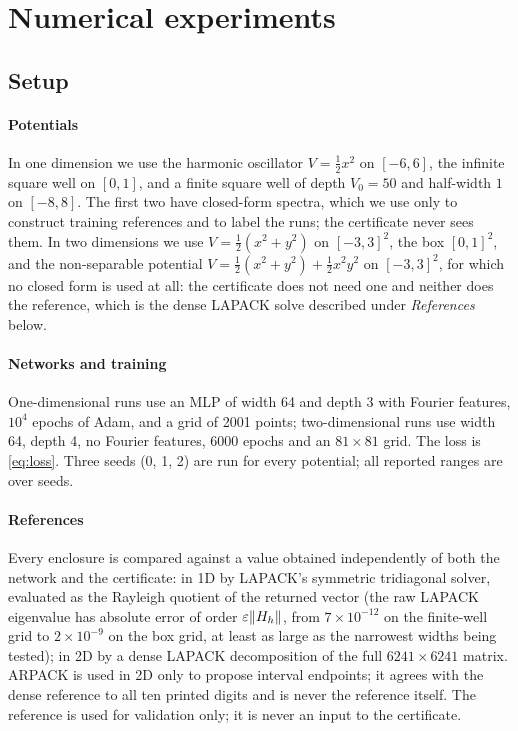 \section{Numerical experiments}
\label{sec:results}

\subsection{Setup}
\label{sec:setup}

\paragraph{Potentials} In one dimension we use the harmonic oscillator
$V=\tfrac12x^2$ on $[-6,6]$, the infinite square well on $[0,1]$, and a finite
square well of depth $V_0=50$ and half-width $1$ on $[-8,8]$. The first two
have closed-form spectra, which we use only to construct training references
and to label the runs; the certificate never sees them. In two dimensions we
use $V=\tfrac12(x^2+y^2)$ on $[-3,3]^2$, the box $[0,1]^2$, and the
non-separable potential $V=\tfrac12(x^2+y^2)+\tfrac12x^2y^2$ on $[-3,3]^2$,
for which no closed form is used at all: the certificate does not need one and
neither does the reference, which is the dense LAPACK solve described under
\emph{References} below.

\paragraph{Networks and training} One-dimensional runs use an MLP of width
64 and depth 3 with Fourier features, $10^4$ epochs of Adam, and a grid of
2001 points; two-dimensional runs use width 64, depth 4, no Fourier features,
6000 epochs and an $81\times81$ grid. The loss is \eqref{eq:loss}. Three seeds
(0, 1, 2) are run for every potential; all reported ranges are over seeds.

\paragraph{References} Every enclosure is compared against a value obtained
independently of both the network and the certificate: in 1D by LAPACK's
symmetric tridiagonal solver, evaluated as the Rayleigh quotient of the
returned vector (the raw LAPACK eigenvalue has absolute error of order
$\varepsilon\lVert H_h\rVert$, from $7\times10^{-12}$ on the finite-well grid to
$2\times10^{-9}$ on the box grid, at least as large as the narrowest widths
being tested); in
2D by a dense LAPACK decomposition of the full $6241\times6241$ matrix. ARPACK
is used in 2D only to propose interval endpoints; it agrees with the dense
reference to all ten printed digits and is never the reference itself. The
reference is used for validation only; it is never an input to the
certificate.

